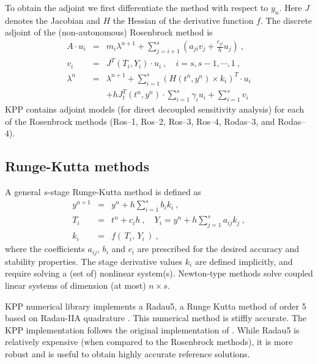 \documentclass[twoside]{article}
\begin{document}
To obtain the adjoint we first differentiate the method with respect to
$y_n$. Here $J$ denotes the Jacobian and $H$ the Hessian of the
derivative function $f$. The discrete adjoint of the (non-autonomous)
Rosenbrock method is
%
\begin{eqnarray}
\label{Ros_disc_adj}
A \cdot u_i
&=& m_i \lambda^{n+1} + \sum_{j=i+1}^s \left( a_{ji} v_j + \frac{c_{ji}}{h}
u_j \right)~,\\
\nonumber
v_i &=& J^T(T_i,Y_i)\cdot u_i~, \quad i = s,s-1,\cdots,1~,\\
\nonumber
\lambda^n &=& \lambda^{n+1} + \sum_{i=1}^s \left( H(t^n,y^n) \times
k_i\right)^T
\cdot u_i\\
\nonumber
&& + h J^T_t(t^n,y^n) \cdot \sum_{i=1}^s \gamma_i u_i+  \sum_{i=1}^s v_i
\end{eqnarray}
%
KPP contains adjoint models  (for  direct decoupled sensitivity analysis)
for each of the Rosenbrock methods (Ros--1, Ros--2, Ros--3, Ros--4,
Rodas--3, and Rodas--4).

\subsection{Runge-Kutta methods}

A general $s$-stage Runge-Kutta method is defined as \cite[Section II.1]{k:HW1}
%
\begin{eqnarray}
\label{eqn:RungeKutta}
y^{n+1} &=& y^n + h \sum_{i=1}^s b_i k_i~,\\
\nonumber
T_i &=& t^n + c_i h~, \quad
Y_i = y^n + h \sum_{j=1}^{s} a_{ij} k_j~,\\
\nonumber
k_i &=& f\left( \, T_i, \, Y_i \,\right)~,
\end{eqnarray}
%
where the coefficients $a_{ij}$, $b_i$ and $c_i$ are prescribed for the
desired accuracy and stability properties. The stage derivative values
$k_i$ are defined implicitly, and require solving a (set of) nonlinear
system(s). Newton-type methods solve coupled linear systems  of dimension
(at most) $n \times s$.

KPP numerical library implements a Radau5, a Runge Kutta method of order
5 based on Radau-IIA quadrature \citep[Section IV.10]{k:HW2}. This
numerical method is stiffly accurate. The KPP implementation follows the
original implementation of \citet{k:HW2}. While Radau5 is relatively
expensive (when compared to the Rosenbrock methods), it is more robust
and is useful to obtain highly accurate reference solutions.
\end{document}
